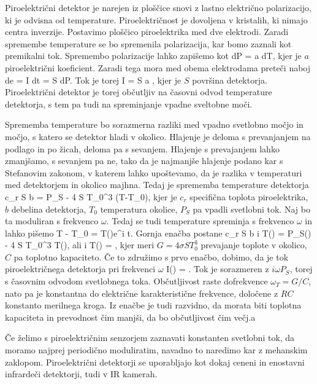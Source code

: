 Piroelektrični detektor je narejen iz ploščice snovi z lastno električno polarizacijo, ki 
je odvisna od temperature. Piroelektričnost  je dovoljena v kristalih, ki nimajo centra 
inverzije. Postavimo ploščico piroelektrika med dve elektrodi. Zaradi spremembe temperature se 
bo spremenila polarizacija, kar bomo zaznali kot premikalni tok. Spremembo polarizacije lahko zapišemo
kot 
\beq
dP = a dT,
\eeq
kjer je $a$ piroelektrični koeficient. Zaradi tega mora med obema elektrodama preteči naboj
\beq
de = I dt = S dP.
\eeq
Tok je torej
\beq
I = S a ,
\eeq
kjer je $S$ površina detektorja. Piroelektrični detektor je torej občutljiv na časovni
odvod temperature detektorja, s tem pa tudi na spreminjanje vpadne sveltobne moči. 

Sprememba temperature bo sorazmerna razliki med vpadno svetlobno močjo in močjo, s katero
se detektor hladi v okolico. Hlajenje je deloma s prevanjanjem na podlago in po žicah, deloma pa s
sevanjem. Hlajenje s prevajanjem lahko zmanjšamo, s sevanjem pa ne, tako da je najmanjše
hlajenje podano kar s Stefanovim zakonom, v katerem lahko upoštevamo, da je razlika
v temperaturi med detektorjem in okolico majhna. Tedaj je sprememba temperature detektorja
\beq
c_r \varrho S b  = P_S - 4 \sigma S T_0^3 (T-T_0),
\eeq
kjer je $c_r$ specifična toplota piroelektrika, $b$ debelina detektorja, $T_0$ temperatura
okolice, $P_S$ pa vpadli svetlobni tok. Naj bo ta moduliran s frekvenco $\omega$. Tedaj se tudi
temperature spreminja s frekvenco $\omega$ in lahko pišemo
\beq
T - T_0 = T(\omega)e^{i \omega t}.
\eeq
Gornja enačba postane
\beq
c_r \varrho S b i \omega T(\omega) = P_S(\omega) - 4 \sigma S T_0^3 T(\omega),
\eeq
ali
\beq
i \omega T(\omega) = ,
\eeq
kjer meri $G = 4 \sigma S T_0^3$ prevajanje toplote v okolico, $C$ pa toplotno
kapaciteto. Če to združimo s prvo enačbo, dobimo, da je tok piroelektričnega detektorja
pri frekvenci $\omega$ 
\beq
I(\omega) = .
\eeq
Tok je sorazmeren z $i\omega P_S$, torej s časovnim odvodom svetlobnega toka. Občutljivost
raste dofrekvence $\omega_T = G/C$, nato pa je konstantna do električne karakteristične frekvence,
določene z $RC$ konstanto merilnega kroga. Iz enačbe je tudi razvidno, da morata biti toplotna
kapaciteta in prevodnost čim manjši, da bo občutljivost čim večj.a

Če želimo s piroelektričnim senzorjem zaznavati konstanten svetlobni tok, da moramo najprej
periodično moduliratim, navadno to naredimo kar z mehanskim zaklopom. Piroelektrični detektorji
se uporabljajo kot dokaj ceneni in enostavni infrardeči detektorji, tudi v IR kamerah. 

